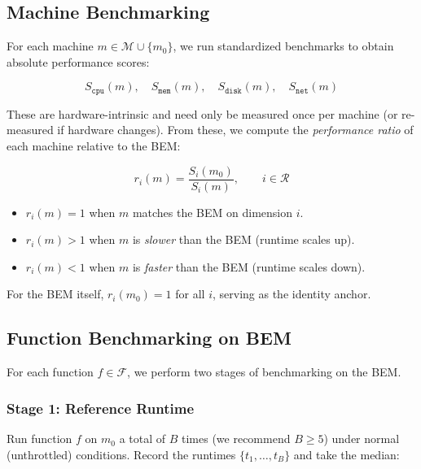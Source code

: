 \documentclass[11pt, a4paper]{article}
\begin{document}
\subsection{Machine Benchmarking}
\label{sec:machine-bench}

For each machine $m \in \mathcal{M} \cup \{m_0\}$, we run standardized
benchmarks to obtain absolute performance scores:

\[
    S_{\texttt{cpu}}(m), \quad S_{\texttt{mem}}(m), \quad
    S_{\texttt{disk}}(m), \quad S_{\texttt{net}}(m)
\]

These are hardware-intrinsic and need only be measured once per machine (or
re-measured if hardware changes). From these, we compute the
\emph{performance ratio} of each machine relative to the BEM:

\begin{equation}
\label{eq:ratio}
    r_i(m) = \frac{S_i(m_0)}{S_i(m)}, \qquad i \in \mathcal{R}
\end{equation}

\begin{itemize}
    \item $r_i(m) = 1$ when $m$ matches the BEM on dimension $i$.
    \item $r_i(m) > 1$ when $m$ is \emph{slower} than the BEM (runtime scales up).
    \item $r_i(m) < 1$ when $m$ is \emph{faster} than the BEM (runtime scales down).
\end{itemize}

For the BEM itself, $r_i(m_0) = 1$ for all $i$, serving as the identity anchor.

\subsection{Function Benchmarking on BEM}
\label{sec:func-bench}

For each function $f \in \mathcal{F}$, we perform two stages of benchmarking
on the BEM.

\subsubsection{Stage 1: Reference Runtime}

Run function $f$ on $m_0$ a total of $B$ times (we recommend $B \geq 5$)
under normal (unthrottled) conditions. Record the runtimes
$\{t_1, \ldots, t_B\}$ and take the median:
\end{document}
